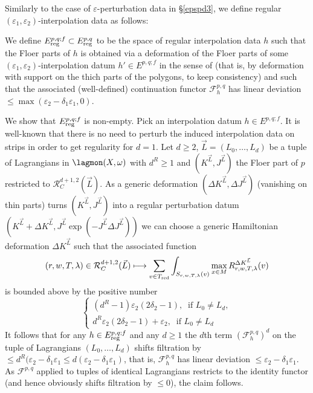 	Similarly to the case of $\varepsilon$-perturbation data in \S \ref{epspd3}, we define regular $(\varepsilon_1,\varepsilon_2)$-interpolation data as follows:
	\begin{dfn}
		We define $E^{p,q;f}_\textnormal{reg}\subset E^{p,q}_\textnormal{reg}$ to be the space of regular interpolation data $h$ such that the Floer parts of $h$ is obtained via a deformation of the Floer parts of some $(\varepsilon_1,\varepsilon_2)$-interpolation datum $h'\in E^{p,q;f}$ in the sense of \cite[Chapter 9k]{Se:book-fukaya-categ} (that is, by deformation with support on the thich parts of the polygons, to keep consistency) and such that the associated (well-defined) continuation functor $\mathcal{F}^{p,q}_h$ has linear deviation $\leq \max\left(\varepsilon_2-\delta_1\varepsilon_1,0\right)$.
	\end{dfn}
	\noindent We show that $E^{p,q;f}_\textnormal{reg}$ is non-empty. Pick an interpolation datum $h\in E^{p,q;f}$. It is well-known that there is no need to perturb the induced interpolation data on strips in order to get regularity for $d=1$. Let $d\geq 2$, $\vec{L}=(L_0,\ldots, L_d)$ be a tuple of Lagrangians in $\lagmon(X,\omega)$ with $d^R\geq 1$ and $\left(K^{\vec{L}}, J^{\vec{L}}\right)$ the Floer part of $p$ restricted to $\mathcal{R}^{d+1,2}_C(\vec{L})$. As a generic deformation $(\Delta K^{\vec{L}}, \Delta J^{\vec{L}})$ (vanishing on thin parts) turns $\left(K^{\vec{L}},J^{\vec{L}}\right)$ into a regular perturbation datum $(K^{\vec{L}}+\Delta K^{\vec{L}},J^{\vec{L}}\exp(-J^{\vec{L}}\Delta J^{\vec{L}})) $ we can choose a generic Hamiltonian deformation $\Delta K^{\vec{L}}$ such that the associated function $$(r,w,T,\lambda)\in \mathcal{R}^{d+1,2}_C(\vec{L})\longmapsto \sum_{v\in T_{\textnormal{red}}}\int_{S_{r,w,T,\lambda}(v)}\max_{x\in M}R^{\Delta K^{\vec{L}}}_{r,w,T,\lambda}(v)$$ is bounded above by the positive number $$\begin{cases}
		(d^R-1)\varepsilon_2(2\delta_2-1), \ \text{ if }  L_0\neq L_d,\\
		d^R\varepsilon_2(2\delta_2-1)+\varepsilon_2 , \ \text{ if } L_0\neq L_d
	\end{cases}$$ It follows that for any $h\in E^{p,q;f}_\textnormal{reg}$ and any $d\geq 1$ the $d$th term $\left(\mathcal{F}^{p,q}_h\right)^d$ on the tuple of Lagrangians $(L_0,\ldots, L_d)$ shifts filtration by $\leq d^R(\varepsilon_2-\delta_1\varepsilon_1\leq d(\varepsilon_2-\delta_1\varepsilon_1)$, that is, $\mathcal{F}^{p,q}_h$ has linear deviation $\leq \varepsilon_2-\delta_1\varepsilon_1$. As $\mathcal{F}^{p,q}$ applied to tuples of identical Lagrangians restricts to the identity functor (and hence obviously shifts filtration by $\leq 0$), the claim follows.